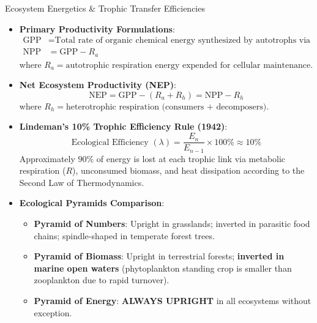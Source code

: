 \begin{formulabox}{Ecosystem Energetics \& Trophic Transfer Efficiencies}
\begin{itemize}[leftmargin=1.2em]
    \item \textbf{Primary Productivity Formulations}:
    \begin{align}
    \text{GPP} &= \text{Total rate of organic chemical energy synthesized by autotrophs via photosynthesis} \\
    \text{NPP} &= \text{GPP} - R_a
    \end{align}
    where $R_a = \text{autotrophic respiration energy expended for cellular maintenance}$.
    \item \textbf{Net Ecosystem Productivity (NEP)}:
    \begin{equation}
    \text{NEP} = \text{GPP} - (R_a + R_h) = \text{NPP} - R_h
    \end{equation}
    where $R_h = \text{heterotrophic respiration (consumers + decomposers)}$.
    \item \textbf{Lindeman's 10\% Trophic Efficiency Rule (1942)}:
    \begin{equation}
    \text{Ecological Efficiency } (\lambda) = \frac{E_n}{E_{n-1}} \times 100\% \approx 10\%
    \end{equation}
    Approximately $90\%$ of energy is lost at each trophic link via metabolic respiration ($R$), unconsumed biomass, and heat dissipation according to the Second Law of Thermodynamics.
    \item \textbf{Ecological Pyramids Comparison}:
    \begin{itemize}
        \item \textbf{Pyramid of Numbers}: Upright in grasslands; inverted in parasitic food chains; spindle-shaped in temperate forest trees.
        \item \textbf{Pyramid of Biomass}: Upright in terrestrial forests; \textbf{inverted in marine open waters} (phytoplankton standing crop is smaller than zooplankton due to rapid turnover).
        \item \textbf{Pyramid of Energy}: \textbf{ALWAYS UPRIGHT} in all ecosystems without exception.
    \end{itemize}
\end{itemize}
\end{formulabox}

